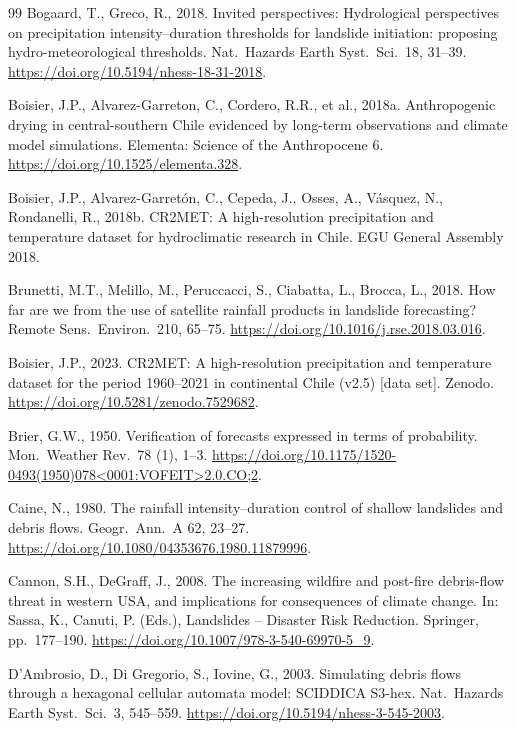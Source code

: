 \documentclass[authoryear,preprint,review,12pt]{elsarticle}
\begin{document}
\begin{thebibliography}{99}
Bogaard, T., Greco, R., 2018. Invited perspectives: Hydrological perspectives on
precipitation intensity--duration thresholds for landslide initiation: proposing
hydro-meteorological thresholds. Nat.\ Hazards Earth Syst.\ Sci.\ 18, 31--39.
\url{https://doi.org/10.5194/nhess-18-31-2018}.

Boisier, J.P., Alvarez-Garreton, C., Cordero, R.R., et al., 2018a. Anthropogenic
drying in central-southern Chile evidenced by long-term observations and climate
model simulations. Elementa: Science of the Anthropocene 6.
\url{https://doi.org/10.1525/elementa.328}.

Boisier, J.P., Alvarez-Garret\'on, C., Cepeda, J., Osses, A., V\'asquez, N.,
Rondanelli, R., 2018b. CR2MET: A high-resolution precipitation and temperature
dataset for hydroclimatic research in Chile. EGU General Assembly 2018.

Brunetti, M.T., Melillo, M., Peruccacci, S., Ciabatta, L., Brocca, L., 2018. How
far are we from the use of satellite rainfall products in landslide forecasting?
Remote Sens.\ Environ.\ 210, 65--75. \url{https://doi.org/10.1016/j.rse.2018.03.016}.

Boisier, J.P., 2023. CR2MET: A high-resolution precipitation and temperature dataset
for the period 1960--2021 in continental Chile (v2.5) [data set]. Zenodo.
\url{https://doi.org/10.5281/zenodo.7529682}.

Brier, G.W., 1950. Verification of forecasts expressed in terms of probability.
Mon.\ Weather Rev.\ 78 (1), 1--3.
\url{https://doi.org/10.1175/1520-0493(1950)078<0001:VOFEIT>2.0.CO;2}.

Caine, N., 1980. The rainfall intensity--duration control of shallow landslides
and debris flows. Geogr.\ Ann.\ A 62, 23--27.
\url{https://doi.org/10.1080/04353676.1980.11879996}.

Cannon, S.H., DeGraff, J., 2008. The increasing wildfire and post-fire
debris-flow threat in western USA, and implications for consequences of climate
change. In: Sassa, K., Canuti, P. (Eds.), Landslides -- Disaster Risk Reduction.
Springer, pp.\ 177--190. \url{https://doi.org/10.1007/978-3-540-69970-5_9}.

D'Ambrosio, D., Di Gregorio, S., Iovine, G., 2003. Simulating debris flows
through a hexagonal cellular automata model: SCIDDICA S3-hex. Nat.\ Hazards
Earth Syst.\ Sci.\ 3, 545--559. \url{https://doi.org/10.5194/nhess-3-545-2003}.


\end{thebibliography}
\end{document}
